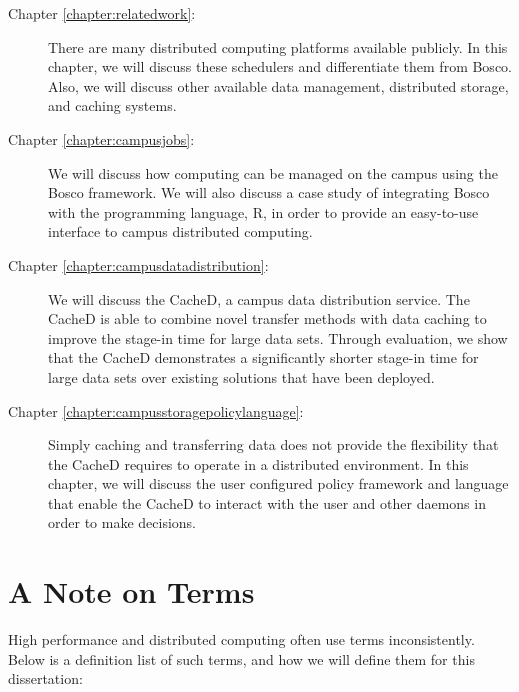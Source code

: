 \begin{description}
	\item[Chapter \ref{chapter:relatedwork}:]  There are many distributed computing platforms available publicly.  In this chapter, we will discuss these schedulers and differentiate them from Bosco.  Also, we will discuss other available data management, distributed storage, and caching systems.
	
	\item[Chapter \ref{chapter:campusjobs}:] We will discuss how computing can be managed on the campus using the Bosco framework.  We will also discuss a case study of integrating Bosco with the programming language, R, in order to provide an easy-to-use interface to campus distributed computing.
	
	\item[Chapter \ref{chapter:campusdatadistribution}:] We will discuss the CacheD, a campus data distribution service.  The CacheD is able to combine novel transfer methods with data caching to improve the stage-in time for large data sets.  Through evaluation, we show that the CacheD demonstrates a significantly shorter stage-in time for large data sets over existing solutions that have been deployed.
	
	\item[Chapter \ref{chapter:campusstoragepolicylanguage}:]  
	Simply caching and transferring data does not provide the flexibility that the CacheD requires to operate in a distributed environment.  In this chapter, we will discuss the user configured policy framework and language that enable the CacheD to interact with the user and other daemons in order to make decisions.
\end{description}


\newpage
\section{A Note on Terms}
High performance and distributed computing often use terms inconsistently.  Below is a definition list of such terms, and how we will define them for this dissertation:


